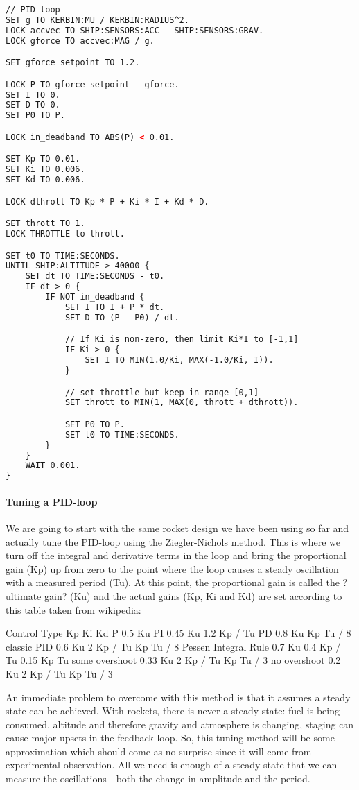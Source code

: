 \begin{lstlisting}[frame=single,language=XML]
// PID-loop
SET g TO KERBIN:MU / KERBIN:RADIUS^2.
LOCK accvec TO SHIP:SENSORS:ACC - SHIP:SENSORS:GRAV.
LOCK gforce TO accvec:MAG / g.

SET gforce_setpoint TO 1.2.

LOCK P TO gforce_setpoint - gforce.
SET I TO 0.
SET D TO 0.
SET P0 TO P.

LOCK in_deadband TO ABS(P) < 0.01.

SET Kp TO 0.01.
SET Ki TO 0.006.
SET Kd TO 0.006.

LOCK dthrott TO Kp * P + Ki * I + Kd * D.

SET thrott TO 1.
LOCK THROTTLE to thrott.

SET t0 TO TIME:SECONDS.
UNTIL SHIP:ALTITUDE > 40000 {
    SET dt TO TIME:SECONDS - t0.
    IF dt > 0 {
        IF NOT in_deadband {
            SET I TO I + P * dt.
            SET D TO (P - P0) / dt.

            // If Ki is non-zero, then limit Ki*I to [-1,1]
            IF Ki > 0 {
                SET I TO MIN(1.0/Ki, MAX(-1.0/Ki, I)).
            }

            // set throttle but keep in range [0,1]
            SET thrott to MIN(1, MAX(0, thrott + dthrott)).

            SET P0 TO P.
            SET t0 TO TIME:SECONDS.
        }
    }
    WAIT 0.001.
}
\end{lstlisting} 

\paragraph{Tuning a PID-loop}
We are going to start with the same rocket design we have been using so far and actually tune the PID-loop using the Ziegler-Nichols method. This is where we turn off the integral and derivative terms in the loop and bring the proportional gain (Kp) up from zero to the point where the loop causes a steady oscillation with a measured period (Tu). At this point, the proportional gain is called the ?ultimate gain? (Ku) and the actual gains (Kp, Ki and Kd) are set according to this table taken from wikipedia:

Control Type	Kp	Ki	Kd
P	0.5 Ku	 	 
PI	0.45 Ku	1.2 Kp / Tu	 
PD	0.8 Ku	 	Kp Tu / 8
classic PID	0.6 Ku	2 Kp / Tu	Kp Tu / 8
Pessen Integral Rule	0.7 Ku	0.4 Kp / Tu	0.15 Kp Tu
some overshoot	0.33 Ku	2 Kp / Tu	Kp Tu / 3
no overshoot	0.2 Ku	2 Kp / Tu	Kp Tu / 3

An immediate problem to overcome with this method is that it assumes a steady state can be achieved. With rockets, there is never a steady state: fuel is being consumed, altitude and therefore gravity and atmosphere is changing, staging can cause major upsets in the feedback loop. So, this tuning method will be some approximation which should come as no surprise since it will come from experimental observation. All we need is enough of a steady state that we can measure the oscillations - both the change in amplitude and the period.

